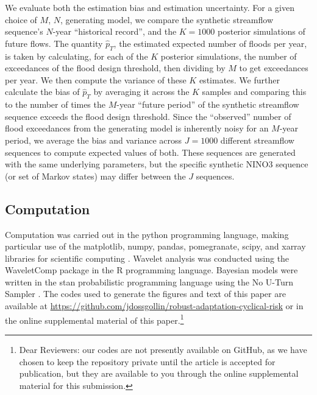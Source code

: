 \documentclass[
  draft,
  linenumbers
]{agujournal2018}
\begin{document}
We evaluate both the estimation bias and estimation uncertainty.
For a given choice of $M$,  $N$, generating model, we compare the synthetic streamflow sequence's $N$-year ``historical record'', and the $K=1000$ posterior simulations of future flows.
The quantity $\hat{p}_T$, the estimated expected number of floods per year, is taken by calculating, for each of the $K$ posterior simulations, the number of exceedances of the flood design threshold, then dividing by $M$ to get exceedances per year.
We then compute the variance of these $K$ estimates.
We further calculate the bias of $\hat{p}_T$ by averaging it across the $K$ samples and comparing this to the number of times the $M$-year ``future period'' of the synthetic streamflow sequence exceeds the flood design threshold.
Since the ``observed'' number of flood exceedances from the generating model is inherently noisy for an $M$-year period, we average the bias and variance across $J=1000$ different streamflow sequences to compute expected values of both.
These sequences are generated with the same underlying parameters, but the specific synthetic NINO3 sequence (or set of Markov states) may differ between the $J$ sequences.

\subsection{Computation}\label{sec:methods-computation}

Computation was carried out in the python programming language, making particular use of the matplotlib, numpy, pandas, pomegranate, scipy, and xarray libraries for scientific computing \citep{Hunter:2007ih, vanderWalt:2011dp, McKinney:2010un, schreiber:2017, Jones:2001uv, Hoyer:2017hs}.
Wavelet analysis was conducted using the WaveletComp package \citep{Roesch:wlBQQoIs} in the R programming language.
Bayesian models were written in the stan probabilistic programming language \citep{Carpenter:2017ke} using the No U-Turn Sampler \citep{Hoffman:2011wm,Betancourt:2017vd}.
The codes used to generate the figures and text of this paper are available at \url{https://github.com/jdossgollin/robust-adaptation-cyclical-risk} or in the online supplemental material of this paper.\footnote{Dear Reviewers: our codes are not presently available on GitHub, as we have chosen to keep the repository private until the article is accepted for publication, but they are available to you through the online supplemental material for this submission.}

\end{document}

